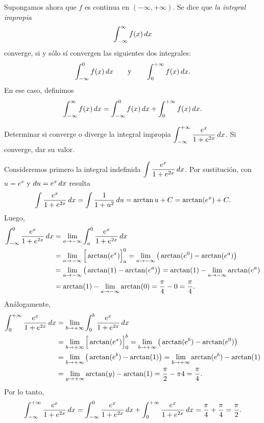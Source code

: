 \begin{definition}
Supongamos ahora que $f$ es continua en $(-\infty,+\infty)$. Se dice que \emph{la integral impropia}
\[
\int_{-\infty}^{\infty} f(x)\,dx
\]  
converge, si y sólo sí convergen las siguientes dos integrales:
\[
\int_{-\infty}^{0} f(x)\,dx
\qquad\text{y}\qquad
\int_{0}^{+\infty} f(x)\,dx.
\]  
En ese caso, definimos
\[
\int_{-\infty}^{\infty} f(x)\,dx = 
\int_{-\infty}^{0} f(x)\,dx
+
\int_{0}^{+\infty} f(x)\,dx.
\]  
\end{definition}

\begin{example}
  Determinar si converge o diverge la integral impropia $\displaystyle \int_{-\infty}^{+\infty} \frac{e^x}{1+e^{2x}}\,dx$. Si converge, dar su valor.

  Consideremos primero la integral indefinida $\displaystyle \int \frac{e^x}{1+e^{2x}}\,dx$. Por sustitución, con $u=e^x$ y $du = e^x\,dx$ resulta
  \[
  \int \frac{e^x}{1+e^{2x}}\,dx = \int \frac1{1+u^2}\,du
  = \arctan u + C = \arctan(e^x) + C.
  \]
  Luego, 
  \begin{align*}
  \int_{-\infty}^{0}  \frac{e^x}{1+e^{2x}}\,dx 
  &= 
  \lim_{a\to-\infty}\int_{a}^{0}  \frac{e^x}{1+e^{2x}}\,dx 
  \\
  &= 
  \lim_{a\to-\infty}\Big[\arctan(e^x)\Big]_{a}^{0}
  = \lim_{a\to-\infty}\big( \arctan(e^0)-\arctan(e^a) \big)
  \\
  &= \lim_{a\to-\infty} \big( \arctan(1) -\arctan(e^a) \big)
  = \arctan(1) - \lim_{a\to-\infty}\arctan(e^a)  
  \\
  &= \arctan(1) - \lim_{a\to-\infty}\arctan(0)
  = \frac\pi4 - 0 = \frac\pi4.
  \end{align*}
  Análogamente,
  \begin{align*}
  \int_{0}^{+\infty}  \frac{e^x}{1+e^{2x}}\,dx 
  &= 
  \lim_{b\to+\infty}\int_{0}^{b}  \frac{e^x}{1+e^{2x}}\,dx 
  \\
  &= 
  \lim_{b\to+\infty}\Big[\arctan(e^x)\Big]_{0}^{b}
  = \lim_{b\to+\infty}\big( \arctan(e^b)-\arctan(e^0) \big)
  \\
  &= \lim_{b\to+\infty} \big( \arctan(e^b) -\arctan(1) \big)
  =  \lim_{b\to+\infty}\arctan(e^b)  - \arctan(1)
  \\
  &= \lim_{y\to+\infty}\arctan(y) - \arctan(1)
  = \frac\pi2 - \pi4 = \frac\pi4.
  \end{align*}
  Por lo tanto,
  \[
  \int_{-\infty}^{+\infty} \frac{e^x}{1+e^{2x}}\,dx
  = \int_{-\infty}^{0} \frac{e^x}{1+e^{2x}}\,dx + \int_{0}^{+\infty} \frac{e^x}{1+e^{2x}}\,dx 
  = \frac{\pi}4 + \frac{\pi}4 = \frac{\pi}2.
  \]
\end{example}

